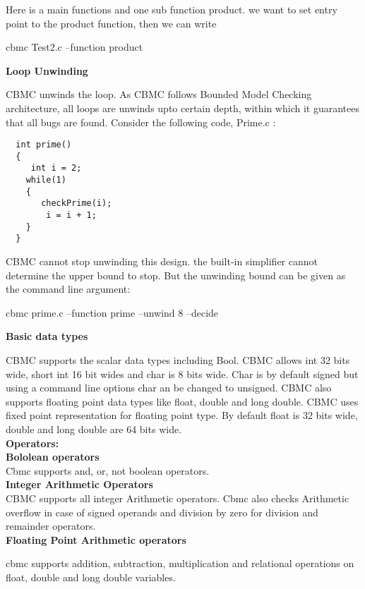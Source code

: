  Here is a main functions and one sub function product. we want to set entry point 
 to the product function, then we can write
 
 cbmc Test2.c --function product
 
 \textbf{Loop Unwinding}
 
 CBMC unwinds the loop. As CBMC follows Bounded Model Checking architecture, all
 loops are unwinds upto certain depth, within which it guarantees that all bugs 
 are found. Consider the following code, Prime.c :
 
 \begin{verbatim}
  int prime()
  {
     int i = 2;
    while(1)
    {
       checkPrime(i);
        i = i + 1;
    }
  }
 \end{verbatim}

 CBMC cannot stop unwinding this design. the built-in simplifier cannot determine
 the upper bound to stop. But the unwinding bound can be given as the command line
 argument:
 
 cbmc prime.c --function prime --unwind 8 --decide
 
 \textbf{Basic data types}
 
 CBMC supports the scalar data types including Bool. CBMC allows int 32 bits
 wide, short int 16 bit wides and char is 8 bits wide.  Char is by default 
 signed but using a  command line options char an be changed  to unsigned. 
 CBMC also supports floating point data types like float, double  and long double.
 CBMC uses fixed point representation for floating point type.  By default float 
 is 32 bits wide, double and long double are 64 bits wide. \\
 
\textbf{ Operators:}  \\
 
 \textbf{Bololean operators} \\
 
 Cbmc supports and, or,  not boolean operators. \\
 
 \textbf{Integer Arithmetic Operators} \\
 
 CBMC supports all integer Arithmetic operators. Cbmc also checks Arithmetic 
 overflow  in case of signed operands and division by zero for division and 
 remainder operators. \\
 
 \textbf{Floating Point Arithmetic operators} 
 
 cbmc supports addition, subtraction, multiplication and relational operations
 on float, double and long double variables. \\
 
